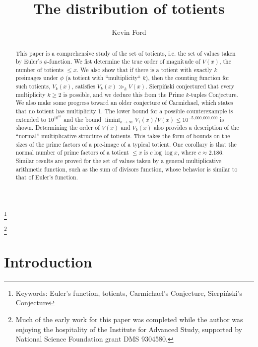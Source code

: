 \documentclass[11pt]{amsart}
\theoremstyle{remark}
\theoremstyle{plain}
\numberwithin{equation}{section}
\renewcommand{\(}{\left(}
\renewcommand{\)}{\right)}
\renewcommand{\le}{\leqslant}
\renewcommand{\ge}{\geqslant}
\begin{document}
\title{The distribution of totients}
\author{Kevin Ford}
\begin{abstract}
This paper is a comprehensive study of the set of totients, i.e.
the set of values taken by Euler's $\phi$-function. 
We fist determine the true order of magnitude of $V(x)$, the
number of totients $\le x$.  We also show that if there is a totient
with exactly $k$ preimages under $\phi$ (a totient with ``multiplicity`` $k$), 
then the counting function for such totients,
$V_k(x)$, satisfies $V_k(x)\gg_k V(x)$.
Sierpi\'nski conjectured that every multiplicity $k\ge 2$
is possible, and we deduce this from the Prime $k$-tuples Conjecture.
We also make some progress toward an
older conjecture of Carmichael, which states that no totient has
multiplicity 1. The
lower bound for a possible counterexample is extended to $10^{10^{10}}$ and the
bound $\liminf_{x\to \infty} V_1(x)/V(x) \le 10^{-5,000,000,000}$ is shown.
Determining the order of $V(x)$ and $V_k(x)$ also provides a description
of the ``normal'' multiplicative structure of totients.  This takes 
the form of bounds on the sizes of the prime factors
of a pre-image of a typical totient.  One corollary is that the
normal number of prime factors of a totient $\le x$ is $c\log\log x$,
where $c\approx 2.186$.  Similar results are proved for 
the set of values taken by a general multiplicative arithmetic function,
such as the sum of divisors function, whose behavior is similar to that of
Euler's function.
\end{abstract}


\thanks{
Keywords: Euler's function, totients, Carmichael's Conjecture,
Sierpi\'nski's Conjecture}

\thanks{
Much of the early
work for this paper was completed while the author was enjoying the
hospitality of the Institute for Advanced Study, supported by National
Science Foundation grant DMS 9304580.}


\maketitle



\section{Introduction}
\end{document}
